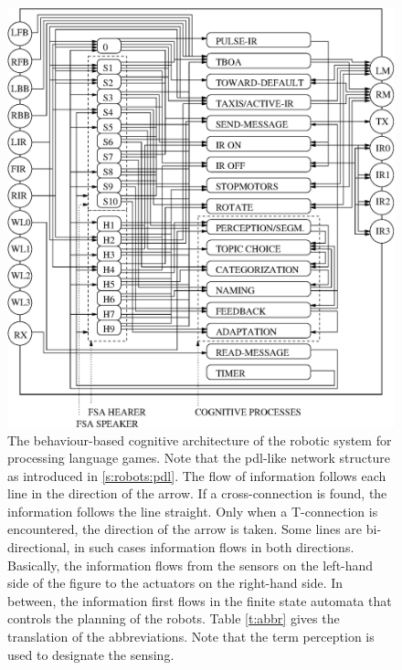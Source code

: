\begin{figure}
\centerline{\includegraphics[width=12cm]{lang_games/architecture.eps}}
\caption{The behaviour-based cognitive architecture of the robotic system for processing language games. Note that the {\sc pdl}-like network structure as introduced in \ref{s:robots:pdl}. The flow of information follows each line in the direction of the arrow. If a cross-connection is found, the information follows the line straight. Only when a T-connection is encountered, the direction of the arrow is taken. Some lines are bi-directional, in such cases information flows in both directions. Basically, the information flows from the sensors on the left-hand side of the figure to the actuators on the right-hand side. In between, the information first flows in the finite state automata that controls the planning of the robots. Table \ref{t:abbr} gives the translation of the abbreviations. Note that the term perception is used to designate the sensing.}
\label{f:architecture}
\end{figure}

